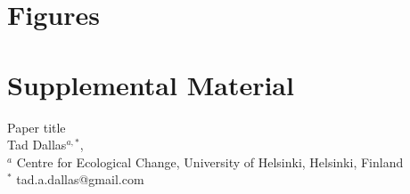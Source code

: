 \documentclass[12pt]{dallasLab}
\begin{document}
\section*{Figures}

\newpage
\begin{figure}[h!]
  \begin{center}
    \caption{}
    \label{fig:}
  \end{center}
\end{figure}










\clearpage
\newcommand{\beginsupplement}{%
        \setcounter{page}{1}
        \setcounter{table}{0}
        \renewcommand{\thetable}{S\arabic{table}}%
        \setcounter{figure}{0}
        \renewcommand{\thefigure}{S\arabic{figure}}%
        }


\section*{Supplemental Material}

{\large Paper title} \\


\noindent Tad Dallas$^{a,*}$,  \\

\noindent $^{a}$ Centre for Ecological Change, University of Helsinki, Helsinki, Finland \\

\noindent $^{*}$ tad.a.dallas@gmail.com \\


\beginsupplement
\end{document}
